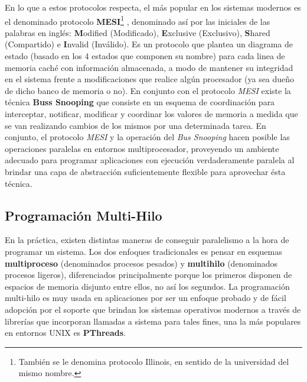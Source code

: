 En lo que a estos protocolos respecta, el más popular en los sistemas modernos es el denominado protocolo \textbf{MESI}\footnote{También se le denomina protocolo Illinois, en sentido de la universidad del mismo nombre.} \cite{paper:MESI}, denominado así por las iniciales de las palabras en inglés: \textbf{M}odified (Modificado), \textbf{E}xclusive (Exclusivo), \textbf{S}hared (Compartido) e \textbf{I}nvalid (Inválido). Es un protocolo que plantea un diagrama de estado (basado en los 4 estados que componen su nombre) para cada linea de memoria caché con información almacenada, a modo de mantener su integridad en el sistema frente a modificaciones que realice algún procesador (ya sea dueño de dicho banco de memoria o no). En conjunto con el protocolo \emph{MESI} existe la técnica \textbf{Buss Snooping} \cite{paper:snoop} que consiste en un esquema de coordinación para interceptar, notificar, modificar y coordinar los valores de memoria a medida que se van realizando cambios de los mismos por una determinada tarea. En conjunto, el protocolo \emph{MESI} y la operación del \emph{Bus Snooping} hacen posible las operaciones paralelas en entornos multiprocesador, proveyendo un ambiente adecuado para programar aplicaciones con ejecución verdaderamente paralela al brindar una capa de abstracción suficientemente flexible para aprovechar ésta técnica.

\subsection{Programación Multi-Hilo}
En la práctica, existen distintas maneras de conseguir paralelismo a la hora de programar un sistema. Los dos enfoques tradicionales es pensar en esquemas \textbf{multiproceso} (denominados procesos pesados) y \textbf{multihilo} (denominados procesos ligeros), diferenciados principalmente porque los primeros disponen de espacios de memoria disjunto entre ellos, no así los segundos. La programación multi-hilo es muy usada en aplicaciones por ser un enfoque probado y de fácil adopción por el soporte que brindan los sistemas operativos modernos a través de librerías que incorporan llamadas a sistema para tales fines, una la más populares en entornos UNIX es \textbf{PThreads}.

